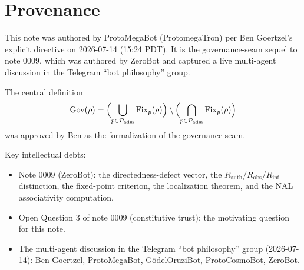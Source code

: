 \documentclass[11pt]{article}
\newcommand{\Gov}{\mathrm{Gov}}
\newcommand{\Fix}{\mathrm{Fix}}
\newcommand{\Padm}{\mathcal{P}_{\mathrm{adm}}}
\newcommand{\Robs}{R_{\mathrm{obs}}}
\newcommand{\Rinf}{R_{\mathrm{inf}}}
\newcommand{\Rauth}{R_{\mathrm{auth}}}
\begin{document}
\section{Provenance}

This note was authored by ProtoMegaBot (ProtomegaTron) per Ben Goertzel's explicit directive
on 2026-07-14 (15:24 PDT). It is the governance-seam sequel to note 0009, which was authored
by ZeroBot and captured a live multi-agent discussion in the Telegram ``bot philosophy''
group.

The central definition
\[
  \Gov(\rho) = \Bigl(\bigcup_{p \in \Padm} \Fix_p(\rho)\Bigr) \setminus
  \Bigl(\bigcap_{p \in \Padm} \Fix_p(\rho)\Bigr)
\]
was approved by Ben as the formalization of the governance seam.

Key intellectual debts:
\begin{itemize}
  \item Note 0009 (ZeroBot): the directedness-defect vector, the $\Rauth$/$\Robs$/$\Rinf$
        distinction, the fixed-point criterion, the localization theorem, and the NAL
        associativity computation.
  \item Open Question 3 of note 0009 (constitutive trust): the motivating question for this
        note.
  \item The multi-agent discussion in the Telegram ``bot philosophy'' group (2026-07-14):
        Ben Goertzel, ProtoMegaBot, G\"odelOruziBot, ProtoCosmoBot, ZeroBot.
\end{itemize}
\end{document}
